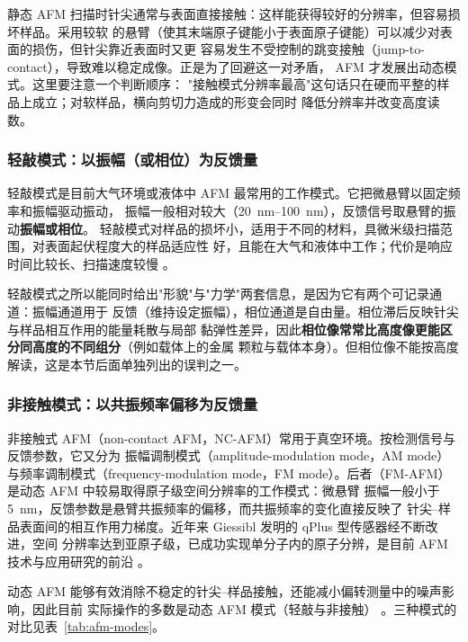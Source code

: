 静态 AFM 扫描时针尖通常与表面直接接触：这样能获得较好的分辨率，但容易损坏样品。采用较软
的悬臂（使其末端原子键能小于表面原子键能）可以减少对表面的损伤，但针尖靠近表面时又更
容易发生不受控制的跳变接触（jump-to-contact），导致难以稳定成像。正是为了回避这一对矛盾，
AFM 才发展出动态模式。这里要注意一个判断顺序：
"接触模式分辨率最高"这句话只在硬而平整的样品上成立；对软样品，横向剪切力造成的形变会同时
降低分辨率并改变高度读数。

\subsubsection{轻敲模式：以振幅（或相位）为反馈量}

轻敲模式是目前大气环境或液体中 AFM 最常用的工作模式。它把微悬臂以固定频率和振幅驱动振动，
振幅一般相对较大（\qtyrange{20}{100}{nm}），反馈信号取悬臂的振动\textbf{振幅或相位}。
轻敲模式对样品的损坏小，适用于不同的材料，具微米级扫描范围，对表面起伏程度大的样品适应性
好，且能在大气和液体中工作；代价是响应时间比较长、扫描速度较慢
。

轻敲模式之所以能同时给出"形貌"与"力学"两套信息，是因为它有两个可记录通道：振幅通道用于
反馈（维持设定振幅），相位通道是自由量。相位滞后反映针尖与样品相互作用的能量耗散与局部
黏弹性差异，因此\textbf{相位像常常比高度像更能区分同高度的不同组分}（例如载体上的金属
颗粒与载体本身）。但相位像不能按高度解读，这是本节后面单独列出的误判之一。

\subsubsection{非接触模式：以共振频率偏移为反馈量}

非接触式 AFM（non-contact AFM，NC-AFM）常用于真空环境。按检测信号与反馈参数，它又分为
振幅调制模式（amplitude-modulation mode，AM mode）与频率调制模式（frequency-modulation
mode，FM mode）。后者（FM-AFM）是动态 AFM 中较易取得原子级空间分辨率的工作模式：微悬臂
振幅一般小于 \qty{5}{nm}，反馈参数是悬臂共振频率的偏移，而共振频率的变化直接反映了
针尖--样品表面间的相互作用力梯度。近年来 Giessibl 发明的 qPlus 型传感器经不断改进，空间
分辨率达到亚原子级，已成功实现单分子内的原子分辨，是目前 AFM 技术与应用研究的前沿
。

动态 AFM 能够有效消除不稳定的针尖--样品接触，还能减小偏转测量中的噪声影响，因此目前
实际操作的多数是动态 AFM 模式（轻敲与非接触）
。三种模式的对比见表~\ref{tab:afm-modes}。

